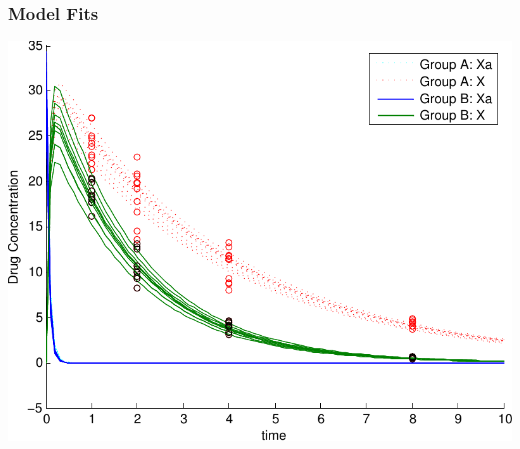 \documentclass[t]{beamer}
\begin{document}
\begin{frame}
  \frametitle{Model Fits}
  \includegraphics[width=\textwidth]{all_fitted.pdf}
\end{frame}
\end{document}
